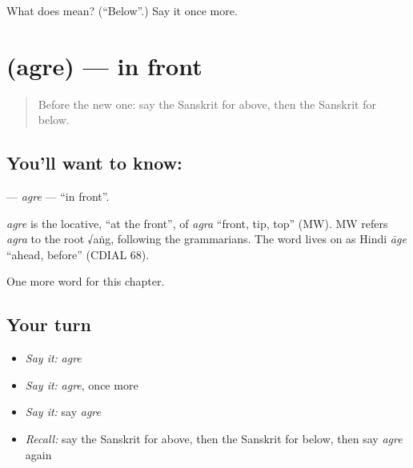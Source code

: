 \begin{tcolorbox}[breakable,colback=teal!4,colframe=teal!35!black,title={Before you move on}]
What does  mean? (\textquotedblleft{}Below\textquotedblright{}.) Say it once more.
\end{tcolorbox}
\section[\texorpdfstring{\sk{अग्रे} (agre)}{अग्रे (agre)}]{ (agre) — in front}

\label{lesson:SA-C94-agre}



\begin{quote}
Before the new one: say the Sanskrit for above, then the Sanskrit for below.
\end{quote}

\subsection*{You'll want to know: }
\textbf{} — \emph{agre} — \textquotedblleft{}in front\textquotedblright{}.

\begin{cousinweb}
\emph{agre} is the locative, \textquotedblleft{}at the front\textquotedblright{}, of \emph{agra} \textquotedblleft{}front, tip, top\textquotedblright{} (MW). MW refers \emph{agra} to the root √aṅg, following the grammarians. The word lives on as Hindi \emph{āge} \textquotedblleft{}ahead, before\textquotedblright{} (CDIAL 68).
\end{cousinweb}

\begin{grammarlens}[title={What you've built}]
One more word for this chapter.
\end{grammarlens}

\subsection*{Your turn}
\begin{itemize}
\raggedright
  \item \emph{Say it:} \emph{agre}
  \item \emph{Say it:} \emph{agre}, once more
  \item \emph{Say it:} say \emph{agre}
  \item \emph{Recall:} say the Sanskrit for above, then the Sanskrit for below, then say \emph{agre} again
\end{itemize}


